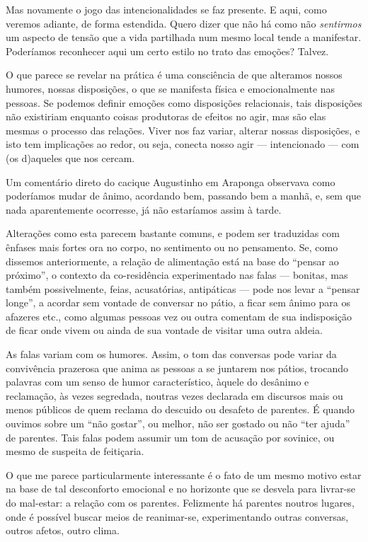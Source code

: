 Mas novamente o jogo das intencionalidades se faz presente. E aqui, como
veremos adiante, de forma estendida. Quero dizer que não há como não
\emph{sentirmos} um aspecto de tensão que a vida partilhada num mesmo
local tende a manifestar. Poderíamos reconhecer aqui um certo estilo no
trato das emoções? Talvez.

O que parece se revelar na prática é uma consciência de que alteramos
nossos humores, nossas disposições, o que se manifesta física e
emocionalmente nas pessoas. Se podemos definir emoções como disposições
relacionais, tais disposições não existiriam enquanto coisas produtoras
de efeitos no agir, mas são elas mesmas o processo das relações. Viver
nos faz variar, alterar nossas disposições, e isto tem implicações ao
redor, ou seja, conecta nosso agir --- intencionado --- com (os
d)aqueles que nos cercam.

Um comentário direto do cacique Augustinho em Araponga observava como
poderíamos mudar de ânimo, acordando bem, passando bem a manhã, e, sem
que nada aparentemente ocorresse, já não estaríamos assim à tarde.

Alterações como esta parecem bastante comuns, e podem ser traduzidas com
ênfases mais fortes ora no corpo, no sentimento ou no pensamento. Se,
como dissemos anteriormente, a relação de alimentação está na base do
``pensar ao próximo'', o contexto da co-residência experimentado nas
falas --- bonitas, mas também possivelmente, feias, acusatórias,
antipáticas --- pode nos levar a ``pensar longe'', a acordar sem vontade
de conversar no pátio, a ficar sem ânimo para os afazeres etc., como
algumas pessoas vez ou outra comentam de sua indisposição de ficar onde
vivem ou ainda de sua vontade de visitar uma outra aldeia.

As falas variam com os humores. Assim, o tom das conversas pode variar
da convivência prazerosa que anima as pessoas a se juntarem nos pátios,
trocando palavras com um senso de humor característico, àquele do
desânimo e reclamação, às vezes segredada, noutras vezes declarada em
discursos mais ou menos públicos de quem reclama do descuido ou desafeto
de parentes. É quando ouvimos sobre um ``não gostar'', ou melhor, não
ser gostado ou não ``ter ajuda'' de parentes. Tais falas podem assumir
um tom de acusação por sovinice, ou mesmo de suspeita de feitiçaria.

O que me parece particularmente interessante é o fato de um mesmo motivo
estar na base de tal desconforto emocional e no horizonte que se desvela
para livrar-se do mal-estar: a relação com os parentes. Felizmente há
parentes noutros lugares, onde é possível buscar meios de reanimar-se,
experimentando outras conversas, outros afetos, outro clima.

